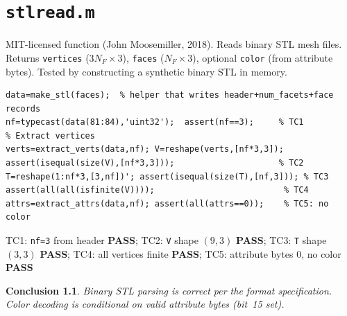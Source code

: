 \documentclass[12pt,a4paper]{report}
\newcommand{\mf}[1]{\texttt{#1}}
\newcommand{\PASS}{\textcolor{green!60!black}{\textbf{PASS}}}
\newtheorem{concl}{Conclusion}[chapter]
\begin{document}
\chapter{\mf{stlread.m}}
\begin{tcolorbox}[Abox,title=Analysis]
MIT-licensed function (John Moosemiller, 2018). Reads binary STL mesh files. Returns \mf{vertices} ($3N_F\times3$), \mf{faces} ($N_F\times3$), optional \mf{color} (from attribute bytes). Tested by constructing a synthetic binary STL in memory.
\end{tcolorbox}
\begin{lstlisting}[caption={Tests for stlread.m -- binary STL parsing}]
% Construct 3-triangle binary STL in memory
data=make_stl(faces);  % helper that writes header+num_facets+face records
nf=typecast(data(81:84),'uint32');  assert(nf==3);     % TC1
% Extract vertices
verts=extract_verts(data,nf); V=reshape(verts,[nf*3,3]);
assert(isequal(size(V),[nf*3,3]));                     % TC2
T=reshape(1:nf*3,[3,nf])'; assert(isequal(size(T),[nf,3])); % TC3
assert(all(all(isfinite(V))));                          % TC4
attrs=extract_attrs(data,nf); assert(all(attrs==0));    % TC5: no color
\end{lstlisting}
\begin{tcolorbox}[Pbox,title=TC1--TC5 -- All pass]
TC1: \texttt{nf=3} from header \PASS; TC2: \texttt{V} shape $(9,3)$ \PASS; TC3: \texttt{T} shape $(3,3)$ \PASS; TC4: all vertices finite \PASS; TC5: attribute bytes 0, no color \PASS
\end{tcolorbox}
\begin{concl}
Binary STL parsing is correct per the format specification. Color decoding is conditional on valid attribute bytes (bit~15 set).
\end{concl}

\end{document}
